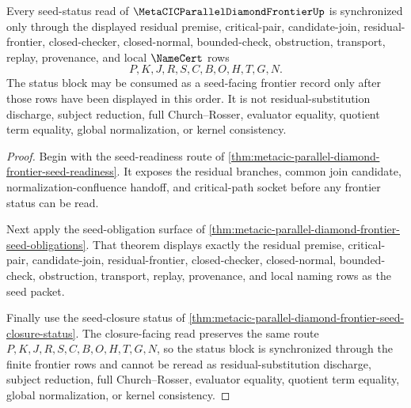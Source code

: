 \begin{theorem}
\label{thm:metacic-parallel-diamond-frontier-seed-status-block-sync}
Every seed-status read of $\MetaCICParallelDiamondFrontierUp$ is synchronized only through the displayed residual premise, critical-pair, candidate-join, residual-frontier, closed-checker, closed-normal, bounded-check, obstruction, transport, replay, provenance, and local $\NameCert$ rows
$$
P,K,J,R,S,C,B,O,H,T,G,N .
$$
The status block may be consumed as a seed-facing frontier record only after those rows have been displayed in this order. It is not residual-substitution discharge, subject reduction, full Church--Rosser, evaluator equality, quotient term equality, global normalization, or kernel consistency.
\end{theorem}
\begin{proof}
Begin with the seed-readiness route of \autoref{thm:metacic-parallel-diamond-frontier-seed-readiness}. It exposes the residual branches, common join candidate, normalization-confluence handoff, and critical-path socket before any frontier status can be read.

Next apply the seed-obligation surface of \autoref{thm:metacic-parallel-diamond-frontier-seed-obligations}. That theorem displays exactly the residual premise, critical-pair, candidate-join, residual-frontier, closed-checker, closed-normal, bounded-check, obstruction, transport, replay, provenance, and local naming rows as the seed packet.

Finally use the seed-closure status of \autoref{thm:metacic-parallel-diamond-frontier-seed-closure-status}. The closure-facing read preserves the same route $P,K,J,R,S,C,B,O,H,T,G,N$, so the status block is synchronized through the finite frontier rows and cannot be reread as residual-substitution discharge, subject reduction, full Church--Rosser, evaluator equality, quotient term equality, global normalization, or kernel consistency.
\end{proof}

